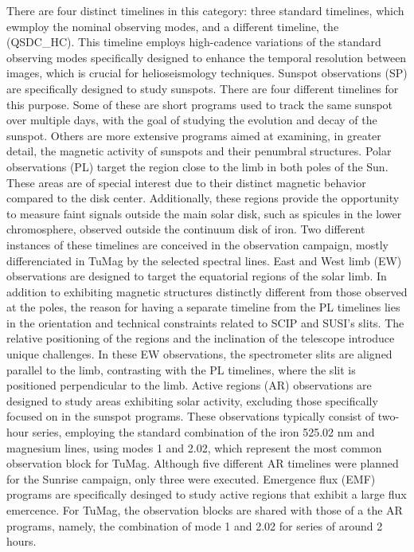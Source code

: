 \begin{itemize}
  There are four distinct timelines in this category: three standard timelines, which ewmploy the nominal observing modes, and a different timeline, the (QSDC{\_}HC). This timeline employs high-cadence variations of the standard observing modes specifically designed to enhance the temporal resolution between images, which is crucial for helioseismology techniques.
  \Myitem Sunspot observations (SP) are specifically designed to study sunspots. There are four different timelines for this purpose. Some of these are short programs used to track the same sunspot over multiple days, with the goal of studying the evolution and decay of the sunspot. Others are more extensive programs aimed at examining, in greater detail, the magnetic activity of sunspots and their penumbral structures.
  \Myitem Polar observations (PL) target the region close to the limb in both poles of the Sun. These areas are of special interest due to their distinct magnetic behavior compared to the disk center. Additionally, these regions provide the opportunity to measure faint signals outside the main solar disk, such as spicules in the lower chromosphere, observed outside the continuum disk of iron. Two different instances of these timelines are conceived in the observation campaign, mostly differenciated in TuMag by the selected spectral lines.
  \Myitem East and West limb (EW) observations are designed to target the equatorial regions of the solar limb. In addition to exhibiting magnetic structures distinctly different from those observed at the poles, the reason for having a separate timeline from the PL timelines lies in the orientation and technical constraints related to SCIP and SUSI's slits. The relative positioning of the regions and the inclination of the telescope introduce unique challenges. In these EW observations, the spectrometer slits are aligned parallel to the limb, contrasting with the PL timelines, where the slit is positioned perpendicular to the limb.
  \Myitem Active regions (AR) observations are designed to study areas exhibiting solar activity, excluding those specifically focused on in the sunspot programs. These observations typically consist of two-hour series, employing the standard combination of the iron 525.02 nm and magnesium lines, using modes 1 and 2.02, which represent the most common observation block for TuMag. Although five different AR timelines were planned for the Sunrise campaign, only three were executed.
  \Myitem Emergence flux (EMF) programs are specifically desinged to study active regions that exhibit a large flux emercence. For TuMag, the observation blocks are shared with those of a the AR programs, namely, the combination of mode 1 and 2.02 for series of around 2 hours. 

\end{itemize}
